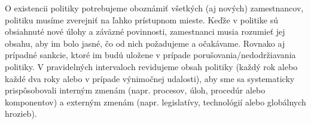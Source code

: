 O existencii politiky potrebujeme oboznámiť všetkých (aj nových) zamestnancov, politiku musíme zverejniť na ľahko prístupnom mieste.
Keďže v politike sú obsiahnuté nové úlohy a záväzné povinnosti, zamestnanci musia rozumieť jej obsahu, aby im bolo jasné, čo od nich
požadujeme a očakávame. Rovnako aj prípadné sankcie, ktoré im budú uložene v prípade porušovania/nedodržiavania politiky. V pravidelných
intervaloch revidujeme obsah politiky (každý rok alebo každé dva roky alebo v prípade výnimočnej udalosti), aby sme sa systematicky
prispôsobovali interným zmenám (napr. procesov, úloh, procedúr alebo komponentov) a externým zmenám (napr. legislatívy, technológií
alebo globálnych hrozieb).
